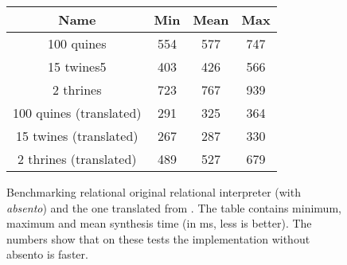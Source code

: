 \begin{figure}
\begin{tabular}{c|c|c|c }
Name &     Min &    Mean &     Max \\\hline
100 quines &   554&   577&   747\\
15 twines5 &   403&   426&   566\\
2 thrines &   723&   767&   939\\
100 quines (translated) &   291&   325&   364\\
15 twines (translated) &   267&   287&   330\\
2 thrines (translated) &   489&   527&   679\\
\end{tabular}

\caption{Benchmarking relational original relational interpreter (with \emph{absento}) and the one translated from \OCanren{}.
The table contains minimum, maximum and mean synthesis time (in ms, less is better).
The numbers show that on these tests the implementation without absento is faster.}
\label{fig:benchmarking1}
\end{figure}


%
